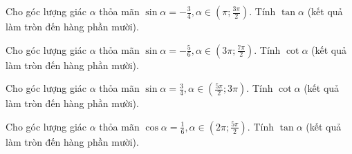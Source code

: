\documentclass[12pt,a4paper]{article}
\begin{document}
\begin{ex}
 Cho góc lượng giác $\alpha$ thỏa mãn $\sin \alpha=- \frac{3}{4}, \alpha \in \left( \pi;\frac{3 \pi}{2} \right)$. Tính $\tan\alpha$ (kết quả làm tròn đến hàng phần mười).\\ 

\end{ex}

\begin{ex}
 Cho góc lượng giác $\alpha$ thỏa mãn $\sin \alpha=- \frac{5}{6}, \alpha \in \left( 3 \pi;\frac{7 \pi}{2} \right)$. Tính $\cot\alpha$ (kết quả làm tròn đến hàng phần mười).\\ 

\end{ex}

\begin{ex}
 Cho góc lượng giác $\alpha$ thỏa mãn $\sin \alpha=\frac{3}{4}, \alpha \in \left( \frac{5 \pi}{2};3\pi \right)$. Tính $\cot\alpha$ (kết quả làm tròn đến hàng phần mười).\\ 

\end{ex}

\begin{ex}
 Cho góc lượng giác $\alpha$ thỏa mãn $\cos \alpha=\frac{1}{6}, \alpha \in \left( 2\pi;\frac{5 \pi}{2} \right)$. Tính $\tan\alpha$ (kết quả làm tròn đến hàng phần mười).\\ 

\end{ex}
\end{document}
